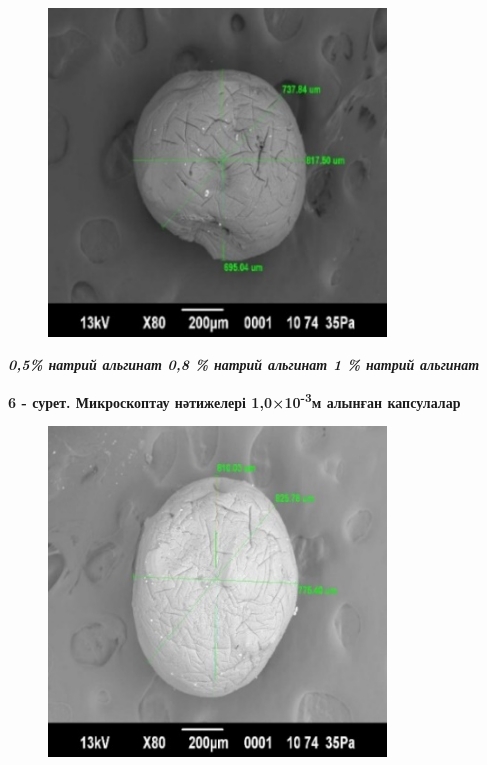 \begin{figure}[H]
	\centering
	\includegraphics[width=0.8\textwidth]{media/pish/image31}
	\caption*{}
\end{figure}


\emph{{\bfseries 0,5\% натрий альгинат 0,8 \% натрий альгинат 1 \% натрий альгинат}}

{\bfseries 6 - сурет. Микроскоптау нәтижелері 1,0×10\textsuperscript{-3}м алынған капсулалар}


\begin{figure}[H]
	\centering
	\includegraphics[width=0.8\textwidth]{media/pish/image32}
	\caption*{}
\end{figure}


